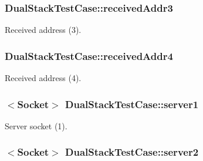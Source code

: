 \subsubsection[{\texorpdfstring{received\+Addr3}{receivedAddr3}}]{ Dual\+Stack\+Test\+Case\+::received\+Addr3\hspace{0.3cm}{\ttfamily [private]}}\hypertarget{classDualStackTestCase_a3440b7105aff5dcd4194efa7e27ee89c}{}\label{classDualStackTestCase_a3440b7105aff5dcd4194efa7e27ee89c}


Received address (3). 

\subsubsection[{\texorpdfstring{received\+Addr4}{receivedAddr4}}]{ Dual\+Stack\+Test\+Case\+::received\+Addr4\hspace{0.3cm}{\ttfamily [private]}}\hypertarget{classDualStackTestCase_a48bffe6296c0466bf3bc12bcbe4dd190}{}\label{classDualStackTestCase_a48bffe6296c0466bf3bc12bcbe4dd190}


Received address (4). 

\subsubsection[{\texorpdfstring{server1}{server1}}]{$<${\bf Socket}$>$ Dual\+Stack\+Test\+Case\+::server1\hspace{0.3cm}{\ttfamily [private]}}\hypertarget{classDualStackTestCase_a62071fab4c4a34e21db3fa485912aecd}{}\label{classDualStackTestCase_a62071fab4c4a34e21db3fa485912aecd}


Server socket (1). 

\subsubsection[{\texorpdfstring{server2}{server2}}]{$<${\bf Socket}$>$ Dual\+Stack\+Test\+Case\+::server2\hspace{0.3cm}{\ttfamily [private]}}\hypertarget{classDualStackTestCase_a1dec50c747b9b140513d695e4dd3aef6}{}\label{classDualStackTestCase_a1dec50c747b9b140513d695e4dd3aef6}



